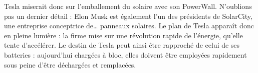 \documentclass[8pt]{article}
\begin{document}
Tesla miserait donc sur l’emballement du solaire avec son PowerWall. N’oublions pas un dernier détail : Elon Musk est également l’un des présidents de SolarCity, une entreprise conceptrice de… panneaux solaires. Le plan de Tesla apparaît donc en pleine lumière : la firme mise sur une révolution rapide de l’énergie, qu’elle tente d’accélérer. Le destin de Tesla peut ainsi être rapproché de celui de ses batteries : aujourd’hui chargées à bloc, elles doivent être employées rapidement sous peine d’être déchargées et remplacées. 
\end{document}
